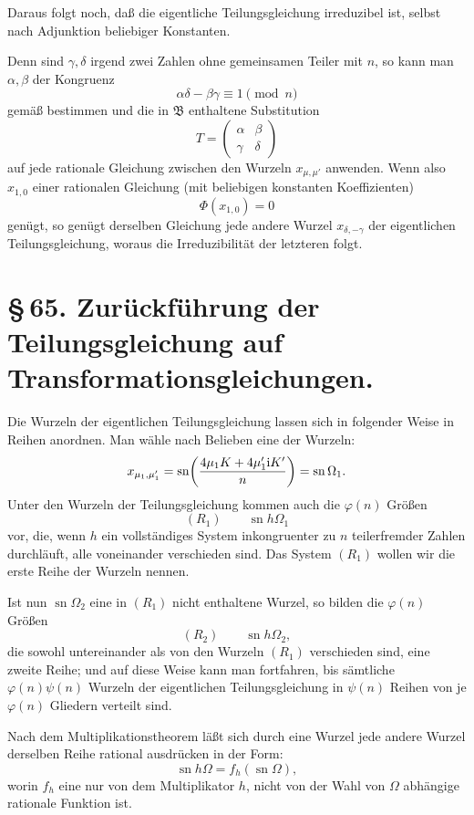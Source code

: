 \documentclass[11pt]{article}
\providecommand{\ii}{\mathrm{i}}
\providecommand{\sn}{\operatorname{sn}}
\begin{document}
Daraus folgt noch, daß die eigentliche Teilungsgleichung irreduzibel ist, selbst nach
Adjunktion beliebiger Konstanten.

Denn sind $\gamma,\delta$ irgend zwei Zahlen ohne gemeinsamen Teiler mit $n$, so kann man
$\alpha,\beta$ der Kongruenz
\[
 \alpha\delta-\beta\gamma\equiv1\pmod n
\]
gemäß bestimmen und die in $\mathfrak B$ enthaltene Substitution
\[
 T=\begin{pmatrix}\alpha&\beta\\ \gamma&\delta\end{pmatrix}
\]
auf jede rationale Gleichung zwischen den Wurzeln $x_{\mu,\mu'}$ anwenden. Wenn also
$x_{1,0}$ einer rationalen Gleichung (mit beliebigen konstanten Koeffizienten)
\[
 \Phi(x_{1,0})=0
\]
genügt, so genügt derselben Gleichung jede andere Wurzel $x_{\delta,-\gamma}$ der
eigentlichen Teilungsgleichung, woraus die Irreduzibilität der letzteren folgt.

\section*{\S\,65. Zurückführung der Teilungsgleichung auf Transformationsgleichungen.}

Die Wurzeln der eigentlichen Teilungsgleichung lassen sich in folgender Weise in Reihen
anordnen. Man wähle nach Belieben eine der Wurzeln:
\[
 x_{\mu_1,\mu'_1}=
 \sn\!\left({4\mu_1K+4\mu'_1\ii K'\over n}\right)=\sn\Omega_1.
\]
Unter den Wurzeln der Teilungsgleichung kommen auch die $\varphi(n)$ Größen
\[
 (R_1)\qquad \sn h\Omega_1
\]
vor, die, wenn $h$ ein vollständiges System inkongruenter zu $n$ teilerfremder Zahlen
durchläuft, alle voneinander verschieden sind. Das System $(R_1)$ wollen wir die erste
Reihe der Wurzeln nennen.

Ist nun $\sn\Omega_2$ eine in $(R_1)$ nicht enthaltene Wurzel, so bilden die $\varphi(n)$
Größen
\[
 (R_2)\qquad \sn h\Omega_2,
\]
die sowohl untereinander als von den Wurzeln $(R_1)$ verschieden sind, eine zweite Reihe;
und auf diese Weise kann man fortfahren, bis sämtliche $\varphi(n)\psi(n)$ Wurzeln der
eigentlichen Teilungsgleichung in $\psi(n)$ Reihen von je $\varphi(n)$ Gliedern verteilt sind.

Nach dem Multiplikationstheorem läßt sich durch eine Wurzel jede andere Wurzel derselben
Reihe rational ausdrücken in der Form:
\begin{equation}
 \sn h\Omega=f_h(\sn\Omega),
\tag{1}
\end{equation}
worin $f_h$ eine nur von dem Multiplikator $h$, nicht von der Wahl von $\Omega$ abhängige
rationale Funktion ist.
\end{document}
